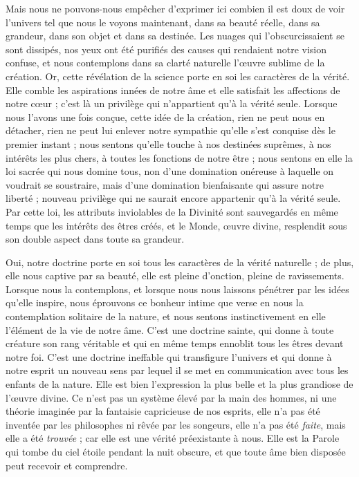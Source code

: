 \documentclass[a4paper, 11pt, oneside, landscape]{article}
\begin{document}
Mais nous ne pouvons-nous empêcher d'exprimer ici combien il est doux de voir l'univers tel que nous le voyons maintenant, dans sa beauté réelle, dans sa grandeur, dans son objet et dans sa destinée. Les nuages qui l'obscurcissaient se sont dissipés, nos yeux ont été purifiés des causes qui rendaient notre vision confuse, et nous contemplons dans sa clarté naturelle l'œuvre sublime de la création. Or, cette révélation de la science porte en soi les caractères de la vérité. Elle comble les aspirations innées de notre âme et elle satisfait les affections de notre cœur ; c'est là un privilège qui n'appartient qu'à la vérité seule. Lorsque nous l'avons une fois conçue, cette idée de la création, rien ne peut nous en détacher, rien ne peut lui enlever notre sympathie qu'elle s'est conquise dès le premier instant ; nous sentons qu'elle touche à nos destinées suprêmes, à nos intérêts les plus chers, à toutes les fonctions de notre être ; nous sentons en elle la loi sacrée qui nous domine tous, non d'une domination onéreuse à laquelle on voudrait se soustraire, mais d'une domination bienfaisante qui assure notre liberté ; nouveau privilège qui ne saurait encore appartenir qu'à la vérité seule. Par cette loi, les attributs inviolables de la Divinité sont sauvegardés en même temps que les intérêts des êtres créés, et le Monde, œuvre divine, resplendit sous son double aspect dans toute sa grandeur.

Oui, notre doctrine porte en soi tous les caractères de la vérité naturelle ; de plus, elle nous captive par sa beauté, elle est pleine d'onction, pleine de ravissements. Lorsque nous la contemplons, et lorsque nous nous laissons pénétrer par les idées qu'elle inspire, nous éprouvons ce bonheur intime que verse en nous la contemplation solitaire de la nature, et nous sentons instinctivement en elle l'élément de la vie de notre âme. C'est une doctrine sainte, qui donne à toute créature son rang véritable et qui en même temps ennoblit tous les êtres devant notre foi. C'est une doctrine ineffable qui transfigure l'univers et qui donne à notre esprit un nouveau sens par lequel il se met en communication avec tous les enfants de la nature. Elle est bien l'expression la plus belle et la plus grandiose de l'œuvre divine. Ce n'est pas un système élevé par la main des hommes, ni une théorie imaginée par la fantaisie capricieuse de nos esprits, elle n'a pas été inventée par les philosophes ni rêvée par les songeurs, elle n'a pas été \emph{faite}, mais elle a été \emph{trouvée} ; car elle est une vérité préexistante à nous. Elle est la Parole qui tombe du ciel étoile pendant la nuit obscure, et que toute âme bien disposée peut recevoir et comprendre.
\end{document}
